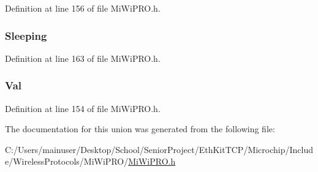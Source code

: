 Definition at line 156 of file Mi\+Wi\+P\+R\+O.\+h.

\hypertarget{union___m_i_w_i___p_r_o___s_t_a_t_e___m_a_c_h_i_n_e_ad2427f44ee7a47befd2ea576e3a97112}{}
\subsubsection[{Sleeping}]{ Sleeping}\label{union___m_i_w_i___p_r_o___s_t_a_t_e___m_a_c_h_i_n_e_ad2427f44ee7a47befd2ea576e3a97112}


Definition at line 163 of file Mi\+Wi\+P\+R\+O.\+h.

\hypertarget{union___m_i_w_i___p_r_o___s_t_a_t_e___m_a_c_h_i_n_e_a5ab8c2bf45b20b5f7aa3a4f083896cec}{}
\subsubsection[{Val}]{ Val}\label{union___m_i_w_i___p_r_o___s_t_a_t_e___m_a_c_h_i_n_e_a5ab8c2bf45b20b5f7aa3a4f083896cec}


Definition at line 154 of file Mi\+Wi\+P\+R\+O.\+h.



The documentation for this union was generated from the following file\+:\begin{DoxyCompactItemize}
\item 
C\+:/\+Users/mainuser/\+Desktop/\+School/\+Senior\+Project/\+Eth\+Kit\+T\+C\+P/\+Microchip/\+Include/\+Wireless\+Protocols/\+Mi\+Wi\+P\+R\+O/\hyperlink{_mi_wi_p_r_o_8h}{Mi\+Wi\+P\+R\+O.\+h}\end{DoxyCompactItemize}
